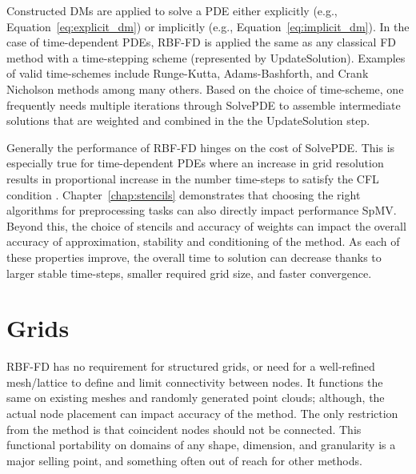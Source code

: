 \documentclass[11pt]{report}
\begin{document}
{Constructed DMs are applied to solve a PDE either explicitly (e.g., Equation~\ref{eq:explicit_dm}) or implicitly (e.g., Equation~\ref{eq:implicit_dm}). In the case of time-dependent PDEs, RBF-FD is applied the same as any classical FD method with a time-stepping scheme (represented by UpdateSolution). Examples of valid time-schemes include Runge-Kutta, Adams-Bashforth, and Crank Nicholson methods among many others. Based on the choice of time-scheme, one frequently needs multiple iterations through SolvePDE to assemble intermediate solutions that are weighted and combined in the the UpdateSolution step.


Generally the performance of RBF-FD hinges on the cost of SolvePDE. This is especially true for time-dependent PDEs where an increase in grid resolution results in proportional increase in the number time-steps to satisfy the CFL condition \cite{CFL}. Chapter~\ref{chap:stencils} demonstrates that choosing the right algorithms for preprocessing tasks can also directly impact performance SpMV. Beyond this, the choice of stencils and accuracy of weights can impact the overall accuracy of approximation, stability and conditioning of the method. As each of these properties improve, the overall time to solution can decrease thanks to larger stable time-steps, smaller required grid size, and faster convergence.

\section{Grids} 


RBF-FD has no requirement for structured grids, or need for a well-refined mesh/lattice to define and limit connectivity between nodes. It functions the same on existing meshes and randomly generated point clouds; although, the actual node placement can impact accuracy of the method. The only restriction from the method is that coincident nodes should not be connected. This functional portability on domains of any shape, dimension, and granularity is a major selling point, and something often out of reach for other methods. 
%
%

}
\end{document}
